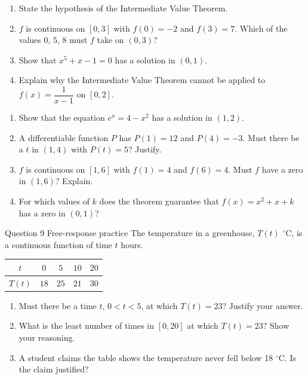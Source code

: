 \documentclass[11pt]{article}
\begin{document}
\newpage
{}

\begin{enumerate}[leftmargin=*,itemsep=2pt]
  \item State the hypothesis of the Intermediate Value Theorem.\work{2.3cm}
  \item $f$ is continuous on $[0,3]$ with $f(0)=-2$ and $f(3)=7$. Which of the values $0$, $5$, $8$ must $f$ take on $(0,3)$?\work{2.3cm}
  \item Show that $x^5+x-1=0$ has a solution in $(0,1)$.\work{2.3cm}
  \item Explain why the Intermediate Value Theorem cannot be applied to $f(x)=\dfrac{1}{x-1}$ on $[0,2]$.\work{2.3cm}
\end{enumerate}

\begin{enumerate}[leftmargin=*,itemsep=2pt,start=5]
  \item Show that the equation $e^x=4-x^2$ has a solution in $(1,2)$.\work{2.8cm}
  \item A differentiable function $P$ has $P(1)=12$ and $P(4)=-3$. Must there be a $t$ in $(1,4)$ with $P(t)=5$? Justify.\work{2.8cm}
  \item $f$ is continuous on $[1,6]$ with $f(1)=4$ and $f(6)=4$. Must $f$ have a zero in $(1,6)$? Explain.\work{2.8cm}
  \item For which values of $k$ does the theorem guarantee that $f(x)=x^2+x+k$ has a zero in $(0,1)$?\work{2.8cm}
\end{enumerate}

\begin{frbox}{Question 9 \textperiodcentered{} Free-response practice}
The temperature in a greenhouse, $T(t)$ $^\circ$C, is a continuous function of time $t$ hours.\begin{center}\renewcommand{\arraystretch}{1.25}\begin{tabular}{|c|c|c|c|c|}\hline $t$ & $0$ & $5$ & $10$ & $20$ \\ \hline $T(t)$ & $18$ & $25$ & $21$ & $30$ \\ \hline\end{tabular}\end{center}
\begin{enumerate}[label=(\alph*),leftmargin=*,itemsep=2pt]
  \item Must there be a time $t$, $0<t<5$, at which $T(t)=23$? Justify your answer.\work{2.6cm}
  \item What is the least number of times in $[0,20]$ at which $T(t)=23$? Show your reasoning.\work{2.6cm}
  \item A student claims the table shows the temperature never fell below 18 $^\circ$C. Is the claim justified?\work{2.6cm}
\end{enumerate}
\end{frbox}
\end{document}

